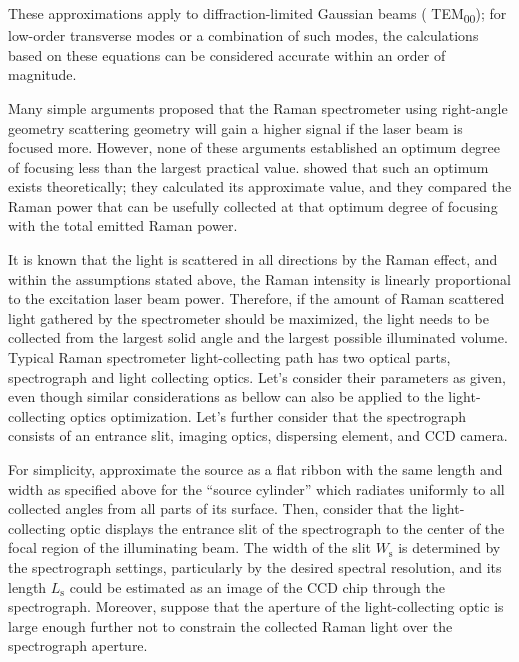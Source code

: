 These approximations apply to diffraction-limited Gaussian beams (
TEM\textsubscript{00}); for low-order transverse modes or a combination of such
modes, the calculations based on these equations can be considered accurate
within an order of magnitude.

Many simple arguments
\parencite{%
	Atwood1963,%
	Barrett1968%
}
proposed that the Raman spectrometer using right-angle geometry scattering
geometry will gain a higher signal if the laser beam is focused more.
However, none of these arguments established an optimum degree of focusing
less than the largest practical value.
\textcite{Barrett1968} showed that such an optimum exists theoretically; they
calculated its approximate value, and they compared the Raman power that can be
usefully collected at that optimum degree of focusing with the total emitted
Raman power.

It is known that the light is scattered in all directions by the Raman effect,
and within the assumptions stated above, the Raman intensity is linearly
proportional to the excitation laser beam power.
Therefore, if the amount of Raman scattered light gathered by the spectrometer
should be maximized, the light needs to be collected from the largest solid
angle and the largest possible illuminated volume.
Typical Raman spectrometer light-collecting path has two optical parts,
spectrograph and light collecting optics.
Let's consider their parameters as given, even though similar considerations as
bellow can also be applied to the light-collecting optics optimization.
Let's further consider that the spectrograph consists of an entrance slit,
imaging optics, dispersing element, and CCD camera.

For simplicity, approximate the source as a flat ribbon with the same length
and width as specified above for the “source cylinder” which radiates uniformly
to all collected angles from all parts of its surface.
Then, consider that the light-collecting optic displays the entrance slit of
the spectrograph to the center of the focal region of the illuminating beam.
The width of the slit $W_\mathrm{s}$ is determined by the spectrograph
settings, particularly by the desired spectral resolution, and its length
$L_\mathrm{s}$ could be estimated as an image of the CCD chip through the
spectrograph.
Moreover, suppose that the aperture of the light-collecting optic is large
enough further not to constrain the collected Raman light over the spectrograph
aperture.

